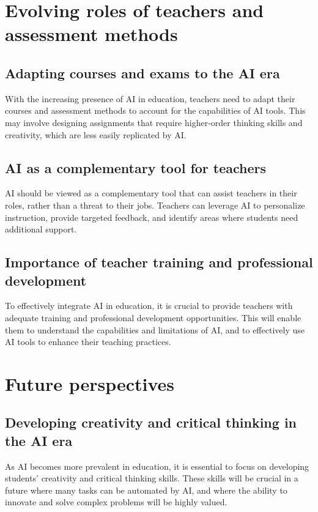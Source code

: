 \documentclass{article}
\begin{document}
\newpage
\section{Evolving roles of teachers and assessment methods}

\subsection{Adapting courses and exams to the AI era}
With the increasing presence of AI in education, teachers need to adapt their courses and assessment methods to account for the capabilities of AI tools. This may involve designing assignments that require higher-order thinking skills and creativity, which are less easily replicated by AI.

\subsection{AI as a complementary tool for teachers}
AI should be viewed as a complementary tool that can assist teachers in their roles, rather than a threat to their jobs. Teachers can leverage AI to personalize instruction, provide targeted feedback, and identify areas where students need additional support.

\subsection{Importance of teacher training and professional development}
To effectively integrate AI in education, it is crucial to provide teachers with adequate training and professional development opportunities. This will enable them to understand the capabilities and limitations of AI, and to effectively use AI tools to enhance their teaching practices.

\newpage
\section{Future perspectives}

\subsection{Developing creativity and critical thinking in the AI era}
As AI becomes more prevalent in education, it is essential to focus on developing students' creativity and critical thinking skills. These skills will be crucial in a future where many tasks can be automated by AI, and where the ability to innovate and solve complex problems will be highly valued.
\end{document}
